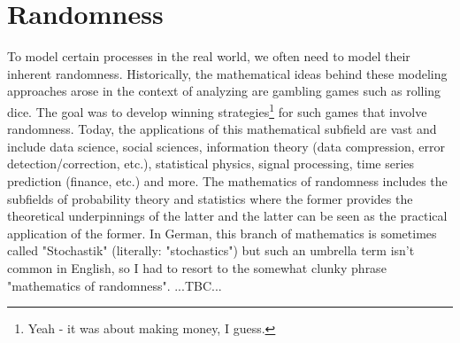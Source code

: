 \chapter{Randomness}
To model certain processes in the real world, we often need to model their inherent randomness. Historically, the mathematical ideas behind these modeling approaches arose in the context of analyzing are gambling games such as rolling dice. The goal was to develop winning strategies\footnote{Yeah - it was about making money, I guess.} for such games that involve randomness. Today, the applications of this mathematical subfield are vast and include data science, social sciences, information theory (data compression, error detection/correction, etc.), statistical physics, signal processing, time series prediction (finance, etc.) and more. The mathematics of randomness includes the subfields of probability theory and statistics where the former provides the theoretical underpinnings of the latter and the latter can be seen as the practical application of the former. In German, this branch of mathematics is sometimes called "Stochastik" (literally: "stochastics") but such an umbrella term isn't common in English, so I had to resort to the somewhat clunky phrase "mathematics of randomness". ...TBC...



\begin{comment}
-In German, we use the term "stochastics" as umbrella term for the mathematics of randomness. The
 field includes probability theory and statistics

\end{comment}